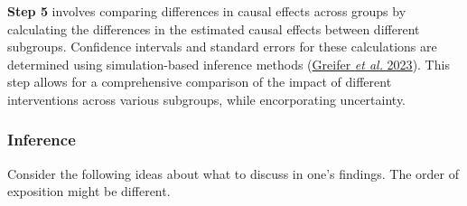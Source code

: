 \documentclass[
  singlecolumn]{article}
\begin{document}
\textbf{Step 5} involves comparing differences in causal effects across
groups by calculating the differences in the estimated causal effects
between different subgroups. Confidence intervals and standard errors
for these calculations are determined using simulation-based inference
methods (\protect\hyperlink{ref-greifer2023}{Greifer \emph{et al.}
2023}). This step allows for a comprehensive comparison of the impact of
different interventions across various subgroups, while encorporating
uncertainty.

\hypertarget{inference}{%
\subsubsection{Inference}\label{inference}}

Consider the following ideas about what to discuss in one's findings.
The order of exposition might be different.
\end{document}
